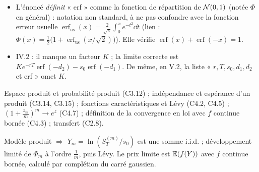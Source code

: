\documentclass[11pt,a4paper]{article}
\begin{document}
\begin{exo}
\begin{alerte}
\begin{itemize}
  \item L'énoncé \emph{définit} « erf » comme la fonction de répartition de $\mathcal{N}(0,1)$ (notée $\Phi$ en général) : notation non
  standard, à ne pas confondre avec la fonction erreur usuelle $\operatorname{erf}_{\text{us}}(x)=\frac2{\sqrt\pi}\int_0^xe^{-t^2}\dd t$
  (lien : $\Phi(x)=\frac12\bigl(1+\operatorname{erf}_{\text{us}}(x/\sqrt2)\bigr)$). Elle vérifie $\operatorname{erf}(x)+\operatorname{erf}(-x)=1$.
  \item IV.2 : il manque un facteur $K$ ; la limite correcte est $Ke^{-rT}\operatorname{erf}(-d_2)-s_0\operatorname{erf}(-d_1)$.
  De même, en V.2, la liste « $r,T,s_0,d_1,d_2$ et erf » omet $K$.
\end{itemize}
\end{alerte}
\outils Espace produit et probabilité produit (C3.12) ; indépendance et espérance d'un produit (C3.14, C3.15) ; fonctions caractéristiques
et Lévy (C4.2, C4.5) ; $(1+\frac{z_m}m)^m\to e^z$ (C4.7) ; définition de la convergence en loi avec $f$ continue bornée (C4.3) ; transfert (C2.8).

\meth Modèle produit $\Rightarrow$ $Y_m=\ln(S^{(m)}_T/s_0)$ est une somme i.i.d. ; développement limité de $\Phi_m$ à l'ordre $\frac1m$,
puis Lévy. Le prix limite est $\mathbb{E}(f(Y))$ avec $f$ continue bornée, calculé par complétion du carré gaussien.


\end{exo}
\end{document}
